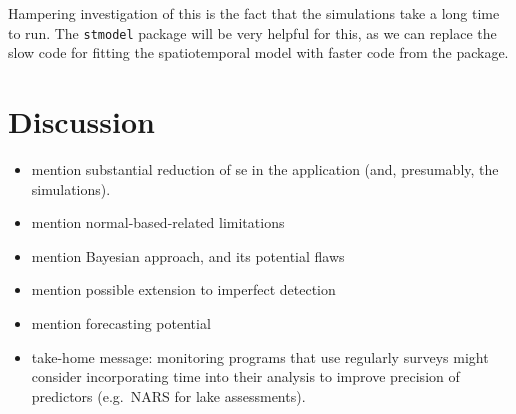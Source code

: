 \documentclass[]{interact}
\theoremstyle{plain}%
\theoremstyle{definition}
\theoremstyle{remark}
\begin{document}
Hampering investigation of this is the fact that the simulations take a
long time to run. The \texttt{stmodel} package will be very helpful for
this, as we can replace the slow code for fitting the spatiotemporal
model with faster code from the package.

\section{Discussion} \label{section:Discussion}

\begin{itemize}
\item
  mention substantial reduction of se in the application (and,
  presumably, the simulations).
\item
  mention normal-based-related limitations
\item
  mention Bayesian approach, and its potential flaws
\item
  mention possible extension to imperfect detection
\item
  mention forecasting potential
\item
  take-home message: monitoring programs that use regularly surveys
  might consider incorporating time into their analysis to improve
  precision of predictors (e.g.~NARS for lake assessments).
\end{itemize}



\end{document}
